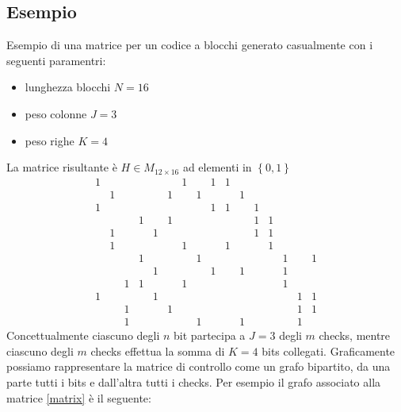 \documentclass{article}
\begin{document}
	\subsection{Esempio}
	Esempio di una matrice per un codice a blocchi generato casualmente con i seguenti paramentri:
	\begin{itemize}
		\item lunghezza blocchi $N = 16$
		\item peso colonne $J  = 3$
		\item peso righe $K = 4$
	\end {itemize}
	La matrice risultante è $H \in M_{12 \times 16}$ ad elementi in $\left\{0,1\right\}$
	\begin{equation} \label{matrix}
		\begin{smallmatrix}
			1& & & & & &1& &1&1& & & & & &  \\
			 &1& & & &1& &1& & &1& & & & &  \\
			1& & & & & & & &1&1& &1& & & &  \\
			 & & &1& &1& & & & & &1&1& & &  \\
			 &1& & &1& & & & & & &1&1& & &  \\
			 &1& & & & &1& & &1& & &1& & &  \\
			 & & &1& & & &1& & & & & &1& &1 \\
			 & & & &1& & & &1& &1& & &1& &  \\
			 & &1&1& & &1& & & & & & &1& &  \\
			1& & & &1& & & & & & & & & &1&1 \\
			 & &1& & &1& & & & & & & & &1&1 \\
			 & &1& & & & &1& & &1& & & &1& 
		\end{smallmatrix}
	\end{equation}
	Concettualmente ciascuno degli $n$ bit partecipa a $J = 3$ degli $m$ checks, mentre ciascuno degli $m$ checks effettua la somma di $K = 4$ bits collegati.
	Graficamente possiamo rappresentare la matrice di controllo come un grafo bipartito, da una parte tutti i bits e dall'altra tutti i checks. Per esempio il grafo associato alla matrice \ref{matrix} è il seguente:
\end{document}
